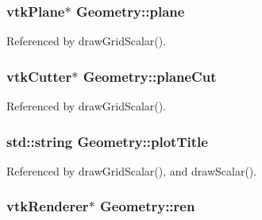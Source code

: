 \hypertarget{classGeometry_a79ad1de7fbe1c74e3e2226489ac7188b}{
\subsubsection[{plane}]{\setlength{\rightskip}{0pt plus 5cm}vtk\-Plane$\ast$ Geometry\-::plane\hspace{0.3cm}{\ttfamily [protected]}}}\label{classGeometry_a79ad1de7fbe1c74e3e2226489ac7188b}


Referenced by draw\-Grid\-Scalar().

\hypertarget{classGeometry_afa017d6536259e954e4ca10337b4353b}{
\subsubsection[{plane\-Cut}]{\setlength{\rightskip}{0pt plus 5cm}vtk\-Cutter$\ast$ Geometry\-::plane\-Cut\hspace{0.3cm}{\ttfamily [protected]}}}\label{classGeometry_afa017d6536259e954e4ca10337b4353b}


Referenced by draw\-Grid\-Scalar().

\hypertarget{classGeometry_aed9f7f434ae099a62be5c20f9915be90}{
\subsubsection[{plot\-Title}]{\setlength{\rightskip}{0pt plus 5cm}std\-::string Geometry\-::plot\-Title\hspace{0.3cm}{\ttfamily [protected]}}}\label{classGeometry_aed9f7f434ae099a62be5c20f9915be90}


Referenced by draw\-Grid\-Scalar(), and draw\-Scalar().

\hypertarget{classGeometry_a0893a3a686dc14327816c9648efe8662}{
\subsubsection[{ren}]{\setlength{\rightskip}{0pt plus 5cm}vtk\-Renderer$\ast$ Geometry\-::ren\hspace{0.3cm}{\ttfamily [protected]}}}\label{classGeometry_a0893a3a686dc14327816c9648efe8662}


